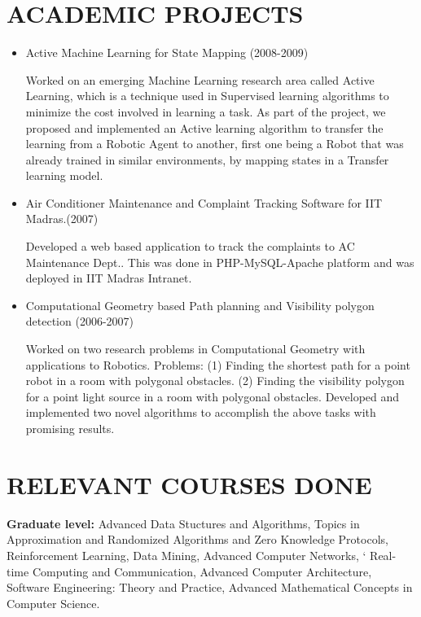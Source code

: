\documentclass{res}
\begin{document}
\begin{resume}
\begin{tabular}{| p{4.7cm}|p{5.5cm}|p{1.6cm}|p{1.7cm}|}
\hline 
\end{tabular} 

\section{ACADEMIC PROJECTS}
\begin{itemize}

\item {Active Machine Learning for State Mapping (2008-2009)}

Worked on an emerging Machine Learning research area called Active Learning, which is a technique used in Supervised learning algorithms to minimize the cost involved in learning a task. As part of the project, we proposed and implemented an Active learning algorithm to transfer the learning from a Robotic Agent to another, first one being a Robot that was already trained in similar environments, by mapping states in a Transfer learning model.

\item {Air Conditioner Maintenance and Complaint Tracking Software for IIT Madras.(2007)}

Developed a web based application to track the complaints to AC Maintenance Dept.. This was done in PHP-MySQL-Apache platform and was deployed in IIT Madras Intranet.

\item {Computational Geometry based Path planning and Visibility polygon detection (2006-2007)}

Worked on two research problems in Computational Geometry with applications to Robotics. Problems: (1) Finding the shortest path for a point robot in a room with polygonal obstacles. (2) Finding the visibility polygon for a point light source in a room with polygonal obstacles. Developed and implemented two novel algorithms to accomplish the above tasks with promising results.

\end{itemize}
  
\section{RELEVANT COURSES DONE}

\textbf{Graduate level:} 
Advanced Data Stuctures and Algorithms, 
Topics in Approximation and Randomized Algorithms and Zero Knowledge Protocols, 
Reinforcement Learning, 
Data Mining, 
Advanced Computer Networks, `
Real-time Computing and Communication, 
Advanced Computer Architecture, 
Software Engineering: Theory and Practice, 
Advanced Mathematical Concepts in Computer Science.


\end{resume}
\end{document}
